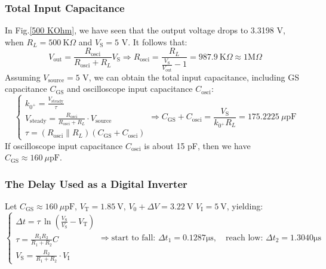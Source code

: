 \documentclass[UTF8]{report}
\def\KO{\ \mathrm{K}\Omega}
\def\pF{\ \mu\mathrm{pF}}
\theoremstyle{MyLineTheoremStyle} %
\theoremstyle{MyBlockTheoremStyle} %
\theoremstyle{MySubsubsectionStyle} %
\begin{document}
\subsubsection{Total Input Capacitance}
In Fig.\ref{500 KOhm}, we have seen that the output voltage drops to 3.3198 V, when $R_L = 500 \KO$ and $V_\text{S} = 5$ V. It follows that:
\begin{equation}
V_\text{out} = \frac{R_{\text{osci}}}{R_{\text{osci}} + R_L}V_\text{S} \Longrightarrow R_{\text{osci}} = \frac{R_L}{\frac{V_\text{S}}{V_\text{out}} - 1} = 987.9 \KO \approx 1 \mathrm{M}\Omega
\end{equation}
Assuming $V_\text{source} = 5$ V, we can obtain the total input capacitance, including GS capacitance $C_{\text{GS}}$ and oscilloscope input capacitance $C_{\text{osci}}$:
\begin{equation}
    \begin{cases}
        k_{0^+} = \frac{V_\text{steady}}{\tau}\\
        V_\text{steady} = \frac{R_{\text{osci}}}{R_{\text{osci}} + R_L}\cdot V_\text{source}\\
        \tau = \left( R_{\text{osci}} \parallel R_L \right) \left(C_{\text{GS}} + C_{\text{osci}} \right)
    \end{cases}
    \Longrightarrow 
    C_{\text{GS}} + C_{\text{osci}}= \frac{V_\text{S}}{k_{0^+}R_L} = 175.2225 \pF
\end{equation}
If oscilloscope input capacitance $C_{\text{osci}}$ is about 15 pF, then we have $C_{\text{GS}} \approx 160 \pF$.

\subsubsection{The Delay Used as a Digital Inverter} 
Let $C_{\text{GS}} \approx 160 \pF$, $V_\text{T} = 1.85 \ \mathrm{V}$, $V_0 + \Delta V = 3.22 \ \mathrm{V}$ $V_\text{I} = 5 \ \mathrm{V}$,  yielding:
\begin{equation}
    \begin{cases}
        \Delta t = \tau \,\ln \left(\frac{V_\text{S}}{V_\text{S}} - V_\text{T}\right) \\ 
        \tau = \frac{R_1 R_2}{R_1 + R_2} C \\ 
        V_\text{S} = \frac{R_2}{R_1 + R_2} \cdot V_\text{I}
    \end{cases}\Longrightarrow 
\text{start to fall:\ } \Delta t_1 = 0.1287 \mathrm{\mu s},\quad \text{reach low:\ } \Delta t_2 = 1.3040  \mathrm{\mu s}
\end{equation}

\captionsetup[figure]{name=图}  
\captionsetup[table]{name=表}
\end{document}
